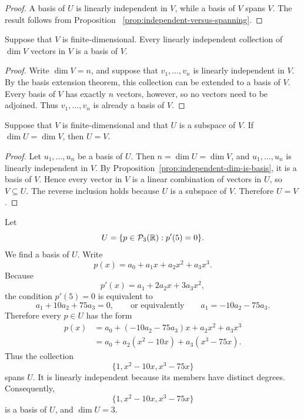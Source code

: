 \begin{proof}
  A basis of $U$ is linearly independent in $V$, while a basis of $V$
  spans $V$. The result follows from Proposition~
  \ref{prop:independent-versus-spanning}.
\end{proof}

\begin{proposition}\label{prop:independent-dim-is-basis}
  Suppose that $V$ is finite-dimensional. Every linearly independent
  collection of $\dim V$ vectors in $V$ is a basis of $V$.
\end{proposition}

\begin{proof}
  Write $\dim V=n$, and suppose that $v_1,\ldots,v_n$ is linearly
  independent in $V$. By the basis extension theorem, this collection
  can be extended to a basis of $V$. Every basis of $V$ has exactly $n$
  vectors, however, so no vectors need to be adjoined. Thus
  $v_1,\ldots,v_n$ is already a basis of $V$.
\end{proof}

\begin{corollary}
  Suppose that $V$ is finite-dimensional and that $U$ is a subspace of
  $V$. If $\dim U=\dim V$, then $U=V$.
\end{corollary}

\begin{proof}
  Let $u_1,\ldots,u_n$ be a basis of $U$. Then
  $n=\dim U=\dim V$, and $u_1,\ldots,u_n$ is linearly independent in
  $V$. By Proposition~\ref{prop:independent-dim-is-basis}, it is a basis
  of $V$. Hence every vector in $V$ is a linear combination of vectors
  in $U$, so $V\subseteq U$. The reverse inclusion holds because $U$ is
  a subspace of $V$. Therefore $U=V$.
\end{proof}

\begin{example}
  Let
  \[
    U=\{p\in\mathcal P_3(\mathbb{R}):p'(5)=0\}.
  \]
  We find a basis of $U$. Write
  \[
    p(x)=a_0+a_1x+a_2x^2+a_3x^3.
  \]
  Because
  \[
    p'(x)=a_1+2a_2x+3a_3x^2,
  \]
  the condition $p'(5)=0$ is equivalent to
  \[
    a_1+10a_2+75a_3=0,
    \qquad\text{or equivalently}\qquad
    a_1=-10a_2-75a_3.
  \]
  Therefore every $p\in U$ has the form
  \begin{align*}
    p(x)
      &=a_0+(-10a_2-75a_3)x+a_2x^2+a_3x^3 \\
      &=a_0+a_2(x^2-10x)+a_3(x^3-75x).
  \end{align*}
  Thus the collection
  \[
    \{1,x^2-10x,x^3-75x\}
  \]
  spans $U$. It is linearly independent because its members have
  distinct degrees. Consequently,
  \[
    \boxed{\{1,x^2-10x,x^3-75x\}}
  \]
  is a basis of $U$, and $\dim U=3$.
\end{example}
